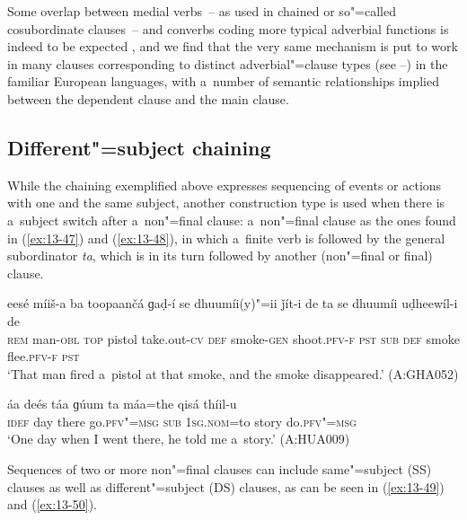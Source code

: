 Some overlap between medial verbs~-- as used in chained or so"=called cosubordinate clauses~-- and converbs coding more typical adverbial functions is indeed to be expected \citep[26]{haspelmath1995}, and we find that the very same mechanism is put to work in many clauses corresponding to distinct adverbial"=clause types (see --) in the familiar European languages, with a~number of semantic relationships implied between the dependent clause and the main clause. 


\subsection{Different"=subject chaining}
\label{subsec:13-3-2}


While the chaining exemplified above expresses sequencing of events or actions with one and the same subject, another construction type is used when there is a~subject switch after a~non"=final clause: a~non"=final clause as the ones found in (\ref{ex:13-47}) and (\ref{ex:13-48}), in which a~finite verb is followed by the general subordinator \textit{ta}, which is in its turn followed by another (non"=final or final) clause.

\begin{exe}
\ex
\label{ex:13-47}
\gll eesé míiš-a ba toopaančá ɡaḍ-í {\ob}se dhuumíi(y)"=ii ǰít-i de ta{\cb} se dhuumíi uḍheewíl-i de \\
\textsc{rem} man-\textsc{obl} \textsc{top} pistol take.out-\textsc{cv} \textsc{def}  smoke-\textsc{gen} shoot.\textsc{pfv-f} \textsc{pst} \textsc{sub} \textsc{def} smoke flee.\textsc{pfv-f} \textsc{pst} \\
\glt `That man fired a~pistol at that smoke, and the smoke disappeared.' (A:GHA052)

\ex
\label{ex:13-48}
\gll {\ob}áa deés táa ɡúum ta{\cb} máa=the qisá thíil-u \\
\textsc{idef} day there go.\textsc{pfv"=msg } \textsc{sub} \textsc{1sg.nom}=to story do.\textsc{pfv"=msg}  \\
\glt `One day when I went there, he told me a~story.' (A:HUA009) 
\end{exe}

Sequences of two or more non"=final clauses can include same"=subject (SS) clauses as well as different"=subject (DS) clauses, as can be seen in (\ref{ex:13-49}) and (\ref{ex:13-50}).

